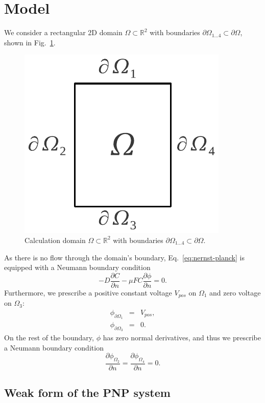 \section{Model}\label{sec:model}

We consider a rectangular 2D domain $\Omega\subset\mathbb{R}^2$ with boundaries 
$\partial\Omega_{1\ldots 4}\subset\partial\Omega$, shown in Fig.~\ref{fig:domain}.

\begin{figure}[!ht]
  \begin{centering}
  \includegraphics[width=0.2\columnwidth]{domain}
  \caption{\label{fig:domain} Calculation domain $\Omega\subset\mathbb{R}^2$
  	with boundaries $\partial\Omega_{1\ldots 4}\subset\partial\Omega$.}
  \end{centering}
\end{figure}

As there is no flow through the domain's boundary, Eq.~\eqref{eq:nernst-planck}
is equipped with a Neumann boundary condition 
\begin{equation}
  -D \frac{\partial C}{\partial n} - \mu F C \frac{\partial \phi} {\partial n} = 0.
  \label{eq:nernst-planck-boundary}
\end{equation}
Furthermore, we prescribe a positive constant voltage $V_{pos}$ 
on $\Omega_1$ and zero voltage on $\Omega_3$:
\begin{eqnarray}
  \phi_{\partial\Omega_1}&=&V_{pos},\\
  \phi_{\partial\Omega_3}&=&0.
  \label{eq:dirichlet}
\end{eqnarray}
On the rest of the boundary, $\phi$ has zero normal derivatives, and thus we prescribe 
a Neumann boundary condition
\begin{equation}
  \frac{\partial \phi_{\Omega_2}}{\partial n}=\frac{\partial \phi_{\Omega_4}}{\partial n}=0.
\end{equation}


\subsection{Weak form of the PNP system}

